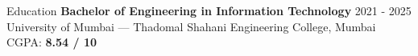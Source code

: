 \documentclass{resume} %
\begin{document}



\begin{rSection}{Education}
    {\bf Bachelor of Engineering in Information Technology} \hfill {2021 - 2025 } \\
    University of Mumbai — Thadomal Shahani Engineering College, Mumbai  \hfill CGPA: {\bf 8.54 / 10}


\end{rSection}
\end{document}
